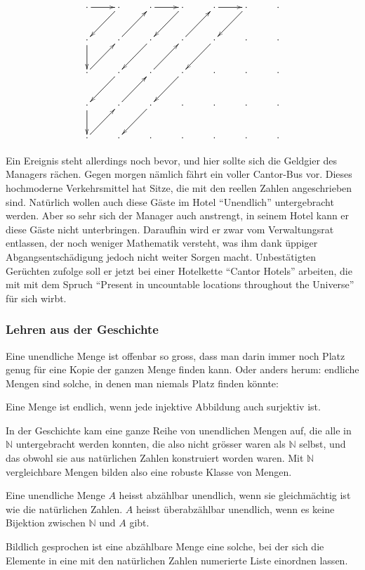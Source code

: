 \[
\xymatrix{
\ar[r]
\cdot	     &\cdot\ar[dl] &\cdot\ar[r] &\cdot\ar[dl]  &\cdot\ar[r] &\cdot\ar[dl] &\cdot
\\
\cdot\ar[d]  &\cdot\ar[ur] &\cdot\ar[dl] &\cdot\ar[ur] &\cdot\ar[dl]&\cdot        &\cdot
\\
\cdot\ar[ur] &\cdot\ar[dl] &\cdot\ar[ur] &\cdot\ar[dl] &\cdot       &\cdot        &\cdot
\\
\cdot\ar[d]  &\cdot\ar[ur] &\cdot\ar[dl] &\cdot        &\cdot       &\cdot        &\cdot
\\
\cdot\ar[ur] &\cdot        &\cdot        &\cdot        &\cdot       &\cdot        &\cdot
}
\]

Ein Ereignis steht allerdings noch bevor, und hier sollte sich die
Geldgier des Managers rächen. Gegen morgen nämlich fährt
ein voller Cantor-Bus vor. Dieses hochmoderne Verkehrsmittel hat Sitze,
%
die mit den reellen Zahlen angeschrieben sind. Natürlich wollen auch
diese Gäste im Hotel ``Unendlich'' untergebracht werden. Aber so sehr
sich der Manager auch anstrengt, in seinem Hotel kann er diese
Gäste nicht unterbringen. Daraufhin wird er zwar vom Verwaltungsrat
entlassen, der noch weniger Mathematik versteht, was ihm dank üppiger
Abgangsentschädigung jedoch nicht weiter Sorgen macht. Unbestätigten
Gerüchten zufolge soll er jetzt bei einer Hotelkette ``Cantor Hotels''
arbeiten, die mit mit dem Spruch ``Present in uncountable locations
throughout the Universe'' für sich wirbt.

\subsubsection{Lehren aus der Geschichte}
Eine unendliche Menge ist offenbar so gross, dass man darin immer noch
Platz genug für eine Kopie der ganzen Menge finden kann. Oder anders
herum: endliche Mengen sind solche, in denen man niemals Platz finden
könnte:

\begin{satz}
Eine Menge ist endlich, wenn jede injektive Abbildung auch surjektiv ist.
\end{satz}

In der Geschichte kam eine ganze Reihe von unendlichen Mengen auf, die
alle in $\mathbb N$ untergebracht werden konnten, die also nicht
grösser waren als $\mathbb N$ selbst, und das obwohl sie aus natürlichen
Zahlen konstruiert worden waren. Mit $\mathbb N$ vergleichbare Mengen
bilden also eine robuste Klasse von Mengen.

\begin{definition}
%
%
Eine unendliche Menge $A$ heisst abzählbar unendlich, wenn sie
gleichmächtig ist wie die natürlichen Zahlen. $A$ heisst
überabzählbar unendlich, wenn es keine Bijektion zwischen
$\mathbb N$ und $A$ gibt.
\end{definition}
Bildlich gesprochen ist eine abzählbare Menge eine solche,
bei der sich die Elemente in eine mit den natürlichen Zahlen numerierte
Liste einordnen lassen.

